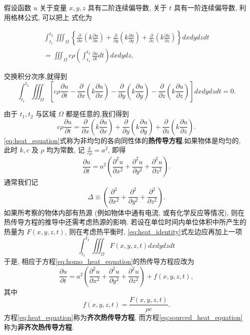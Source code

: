 假设函数 $u$ 关于变量 $x, y, z$ 具有二阶连续偏导数, 关于 $t$ 具有一阶连续偏导数, 利用格林公式, 可以把上 式化为

\begin{equation}
\begin{gathered}
\int_{t_1}^{t_2} \iiint_{\Omega}\left\{\frac{\partial}{\partial x}\left(k \frac{\partial u}{\partial x}\right)+\frac{\partial}{\partial y}\left(k \frac{\partial u}{\partial y}\right)+\frac{\partial}{\partial z}\left(k \frac{\partial u}{\partial z}\right)\right\} d x d y d z d t \\
=\iiint_{\Omega} c \rho\left(\int_{t_1}^{t_2} \frac{\partial u}{\partial t} d t\right) d x d y d z,
\label{eq:heat_identity}
\end{gathered}
\end{equation}

交换积分次序,就得到
$$
\int_{t_1}^{t_2} \iiint_{\Omega}\left[c \rho \frac{\partial u}{\partial t}-\frac{\partial}{\partial x}
\left(k \frac{\partial u}{\partial x}\right)-\frac{\partial}{\partial y}
\left(k \frac{\partial u}{\partial y}\right)-\frac{\partial}{\partial z}
\left(k \frac{\partial u}{\partial z}\right)\right] d x d y d z d t=0 .
$$

由于 $t_1, t_2$ 与区域 $\Omega$ 都是任意的,我们得到
\begin{equation}
c \rho \frac{\partial u}{\partial t}=\frac{\partial}{\partial x}
\left(k \frac{\partial u}{\partial x}\right)+\frac{\partial}{\partial y}
\left(k \frac{\partial u}{\partial y}\right)+\frac{\partial}{\partial z}
\left(k \frac{\partial u}{\partial z}\right) .
\label{eq:heat_equation}
\end{equation}
\eqref{eq:heat_equation}式称为非均匀的各向同性体的\textbf{热传导方程}.如果物体是均匀的, 
此时 $k, c$ 及 $\rho$ 均为常数, 记 $\frac{k}{c \rho}=a^2$, 即得
\begin{equation}
\frac{\partial u}{\partial t}=a^2\left(\frac{\partial^2 u}{\partial x^2}
+\frac{\partial^2 u}{\partial y^2}+\frac{\partial^2 u}{\partial z^2}\right) .
\label{eq:homo_heat_equation}
\end{equation}
通常我们记
\begin{equation}
   \Delta \equiv \left(\frac{\partial^2 }{\partial x^2}
+\frac{\partial^2 }{\partial y^2}+\frac{\partial^2 }{\partial z^2}\right) .
    \label{eq:Delta}
\end{equation}
如果所考察的物体内部有热源 (例如物体中通有电流, 或有化学反应等情况), 则在热传导方程的推导中还需考虑热源的影响.
若设在单位时间内单位体积中所产生的热量为 $F(x, y, z, t)$, 则在考虑热平衡时, \eqref{eq:heat_identity}式左边应再加上一项
$$
\int_{t_1}^{t_2} \iiint_{\Omega} F(x, y, z, t) d x d y d z d t
$$
于是, 相应于方程\eqref{eq:homo_heat_equation}的热传导方程应改为
\begin{equation}
    \frac{\partial u}{\partial t}=a^2\left(\frac{\partial^2 u}{\partial x^2}+
    \frac{\partial^2 u}{\partial y^2}+\frac{\partial^2 u}{\partial z^2}\right)+f(x, y, z, t),
    \label{eq:sourced_heat_equation}
\end{equation}
其中
$$
f(x, y, z, t)=\frac{F(x, y, z, t)}{\rho c} .
$$
方程\eqref{eq:heat_equation}称为\textbf{齐次热传导方程}, 而方程\eqref{eq:sourced_heat_equation} 称为\textbf{非齐次热传导方程}.



